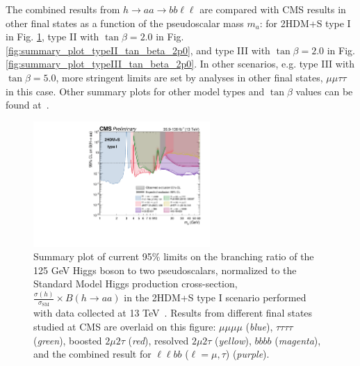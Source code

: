 The combined results from $h\rightarrow aa \rightarrow bb\ell\ell$ are compared with CMS results in other final states as a function of the pseudoscalar mass $m_a$: for 2HDM+S type I in Fig. \ref{fig:summary_plot_type_I}, type II with $\tan\beta = 2.0$ in Fig. \ref{fig:summary_plot_typeII_tan_beta_2p0}, and type III with $\tan\beta = 2.0$ in Fig. \ref{fig:summary_plot_typeIII_tan_beta_2p0}. In other scenarios, e.g. type III with $\tan\beta = 5.0$, more stringent limits are set by analyses in other final states, $\mu\mu\tau\tau$ in this case. Other summary plots for other model types and $\tan\beta$ values can be found at~\cite{twiki_2HDM+S_summary-plots}.


\begin{figure}[h]
    \begin{center}
      \includegraphics[width=0.6\textwidth]{figures/ch-10-results/summary_plot_full_run2_plot_BRaa_Type1.pdf}
    \end{center}
    \caption[Summary plot of current observed and expected 95\% CL limits on the branching ratio of the 125 GeV Higgs boson to two pseudoscalars, normalized to the Standard Model Higgs production cross-section, $\frac{\sigma(h)}{\sigma_{\text{SM}}} \times B(h \rightarrow aa)$, in the 2HDM+S type I scenario, obtained at CMS with data collected at 13 TeV.]{Summary plot of current 95\% limits on the branching ratio of the 125 GeV Higgs boson to two pseudoscalars, normalized to the Standard Model Higgs production cross-section, $\frac{\sigma(h)}{\sigma_{\text{SM}}} \times B(h \rightarrow aa)$ in the 2HDM+S type I scenario performed with data collected at 13 TeV~\cite{twiki_2HDM+S_summary-plots}. Results from different final states studied at CMS are overlaid on this figure: $\mu\mu\mu\mu$ (\textit{blue}), $\tau\tau\tau\tau$ (\textit{green}), boosted $2\mu 2\tau$ (\textit{red}), resolved $2\mu 2\tau$ (\textit{yellow}), $bbbb$ (\textit{magenta}), and the combined result for $\ell\ell bb$ ($\ell = \mu, \tau$) (\textit{purple}).}
      \label{fig:summary_plot_type_I}
  \end{figure}
